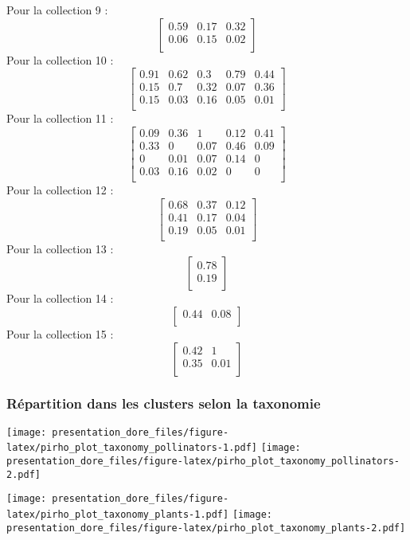 \documentclass[
]{article}
\begin{document}
Pour la collection 9 :
\[\begin{bmatrix} 0.59 &0.17 &0.32 \\0.06 &0.15 &0.02 \\ \end{bmatrix}\]
Pour la collection 10 :
\[\begin{bmatrix} 0.91 &0.62 &0.3 &0.79 &0.44 \\0.15 &0.7 &0.32 &0.07 &0.36 \\0.15 &0.03 &0.16 &0.05 &0.01 \\ \end{bmatrix}\]
Pour la collection 11 :
\[\begin{bmatrix} 0.09 &0.36 &1 &0.12 &0.41 \\0.33 &0 &0.07 &0.46 &0.09 \\0 &0.01 &0.07 &0.14 &0 \\0.03 &0.16 &0.02 &0 &0 \\ \end{bmatrix}\]
Pour la collection 12 :
\[\begin{bmatrix} 0.68 &0.37 &0.12 \\0.41 &0.17 &0.04 \\0.19 &0.05 &0.01 \\ \end{bmatrix}\]
Pour la collection 13 : \[\begin{bmatrix} 0.78 \\0.19 \\ \end{bmatrix}\]
Pour la collection 14 : \[\begin{bmatrix} 0.44 &0.08 \\ \end{bmatrix}\]
Pour la collection 15 :
\[\begin{bmatrix} 0.42 &1 \\0.35 &0.01 \\ \end{bmatrix}\]

\hypertarget{ruxe9partition-dans-les-clusters-selon-la-taxonomie-3}{%
\subsubsection{Répartition dans les clusters selon la
taxonomie}\label{ruxe9partition-dans-les-clusters-selon-la-taxonomie-3}}

\texttt{[image: presentation\_dore\_files/figure-latex/pirho\_plot\_taxonomy\_pollinators-1.pdf]}
\texttt{[image: presentation\_dore\_files/figure-latex/pirho\_plot\_taxonomy\_pollinators-2.pdf]}

\texttt{[image: presentation\_dore\_files/figure-latex/pirho\_plot\_taxonomy\_plants-1.pdf]}
\texttt{[image: presentation\_dore\_files/figure-latex/pirho\_plot\_taxonomy\_plants-2.pdf]}
\end{document}
